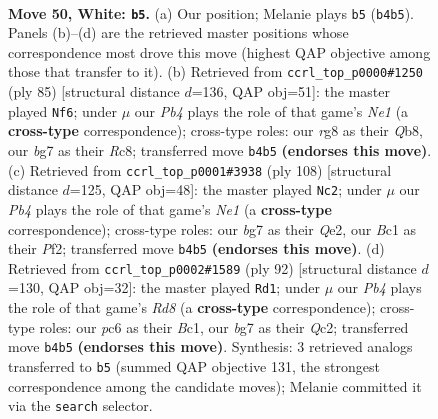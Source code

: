 \documentclass[11pt]{article}
\begin{document}
\clearpage

\begin{figure}[p]\centering
\begin{subfigure}{0.46\textwidth}\centering
\resizebox{\linewidth}{!}{%
\newchessgame
\chessboard[
  setfen={rn1qk1r1/4n1b1/2p3p1/3p2P1/1P1P1P1p/2R4P/2NQBK2/2B4R w - - 1 50},
  showmover=false,
  pgfstyle=straightmove, color=movearrow, markmove={b4-b5}
]}
\caption{}
\end{subfigure}\hfill
\begin{subfigure}{0.46\textwidth}\centering
\resizebox{\linewidth}{!}{%
\newchessgame
\chessboard[
  setfen={bqr1n1k1/5pp1/rp1pp2p/8/1PPNPP2/1Q3B1P/2R3P1/3R3K b - - 32 43},
  showmover=false,
  pgfstyle=straightmove, color=movearrow, markmove={e8-f6}
]}
\caption{}
\end{subfigure}
\\[4pt]
\begin{subfigure}{0.46\textwidth}\centering
\resizebox{\linewidth}{!}{%
\newchessgame
\chessboard[
  setfen={b3r1k1/2qn1pp1/1p5p/1Pn1p3/2P4P/R5PB/1B2QP2/4N1K1 w - - 9 55},
  showmover=false,
  pgfstyle=straightmove, color=movearrow, markmove={e1-c2}
]}
\caption{}
\end{subfigure}\hfill
\begin{subfigure}{0.46\textwidth}\centering
\resizebox{\linewidth}{!}{%
\newchessgame
\chessboard[
  setfen={3R4/pq2rppk/1r3n2/2p4p/2P1p3/P1R3PP/2Q1PP1K/2B5 w - - 4 47},
  showmover=false,
  pgfstyle=straightmove, color=movearrow, markmove={d8-d1}
]}
\caption{}
\end{subfigure}
\caption{\textbf{Move 50, White: \texttt{b5}.} (a) Our position; Melanie plays \texttt{b5} (\texttt{b4b5}). Panels (b)--(d) are the retrieved master positions whose correspondence most drove this move (highest QAP objective among those that transfer to it). (b) Retrieved from \texttt{ccrl\_top\_p0000\#1250} (ply 85) [structural distance $d$=136, QAP obj=51]: the master played \texttt{Nf6}; under $\mu$ our \emph{Pb4} plays the role of that game's \emph{Ne1} (a \textbf{cross-type} correspondence); cross-type roles: our \emph{r}g8 as their \emph{Q}b8, our \emph{b}g7 as their \emph{R}c8; transferred move \texttt{b4b5} \textbf{(endorses this move)}. (c) Retrieved from \texttt{ccrl\_top\_p0001\#3938} (ply 108) [structural distance $d$=125, QAP obj=48]: the master played \texttt{Nc2}; under $\mu$ our \emph{Pb4} plays the role of that game's \emph{Ne1} (a \textbf{cross-type} correspondence); cross-type roles: our \emph{b}g7 as their \emph{Q}e2, our \emph{B}c1 as their \emph{P}f2; transferred move \texttt{b4b5} \textbf{(endorses this move)}. (d) Retrieved from \texttt{ccrl\_top\_p0002\#1589} (ply 92) [structural distance $d$=130, QAP obj=32]: the master played \texttt{Rd1}; under $\mu$ our \emph{Pb4} plays the role of that game's \emph{Rd8} (a \textbf{cross-type} correspondence); cross-type roles: our \emph{p}c6 as their \emph{B}c1, our \emph{b}g7 as their \emph{Q}c2; transferred move \texttt{b4b5} \textbf{(endorses this move)}. Synthesis: 3 retrieved analogs transferred to \texttt{b5} (summed QAP objective 131, the strongest correspondence among the candidate moves); Melanie committed it via the \texttt{search} selector.}
\label{fig:thought-m98}
\end{figure}
\end{document}
